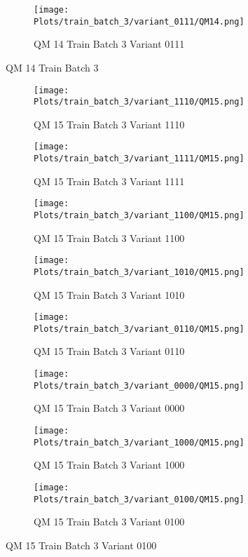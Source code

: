 \documentclass{DissertateFigs}
\begin{document}
\begin{figure}[t!]
\medskip

    \begin{subfigure}{0.47\textwidth}
    \texttt{[image: Plots/train\_batch\_3/variant\_0111/QM14.png]}
    \caption{QM 14 Train Batch 3 Variant 0111}
    \end{subfigure}
\caption{QM 14 Train Batch 3}
    \end{figure}
\clearpage
\begin{figure}[t!]
    \begin{subfigure}{0.32\textwidth}
    \texttt{[image: Plots/train\_batch\_3/variant\_1110/QM15.png]}
    \caption{QM 15 Train Batch 3 Variant 1110}
    \end{subfigure}
    \begin{subfigure}{0.32\textwidth}
    \texttt{[image: Plots/train\_batch\_3/variant\_1111/QM15.png]}
    \caption{QM 15 Train Batch 3 Variant 1111}
    \end{subfigure}

\medskip

    \begin{subfigure}{0.32\textwidth}
    \texttt{[image: Plots/train\_batch\_3/variant\_1100/QM15.png]}
    \caption{QM 15 Train Batch 3 Variant 1100}
    \end{subfigure}
    \begin{subfigure}{0.32\textwidth}
    \texttt{[image: Plots/train\_batch\_3/variant\_1010/QM15.png]}
    \caption{QM 15 Train Batch 3 Variant 1010}
    \end{subfigure}

\medskip

    \begin{subfigure}{0.32\textwidth}
    \texttt{[image: Plots/train\_batch\_3/variant\_0110/QM15.png]}
    \caption{QM 15 Train Batch 3 Variant 0110}
    \end{subfigure}
    \begin{subfigure}{0.32\textwidth}
    \texttt{[image: Plots/train\_batch\_3/variant\_0000/QM15.png]}
    \caption{QM 15 Train Batch 3 Variant 0000}
    \end{subfigure}

\medskip

    \begin{subfigure}{0.32\textwidth}
    \texttt{[image: Plots/train\_batch\_3/variant\_1000/QM15.png]}
    \caption{QM 15 Train Batch 3 Variant 1000}
    \end{subfigure}
    \begin{subfigure}{0.32\textwidth}
    \texttt{[image: Plots/train\_batch\_3/variant\_0100/QM15.png]}
    \caption{QM 15 Train Batch 3 Variant 0100}
    \end{subfigure}


\end{figure}
\end{document}
